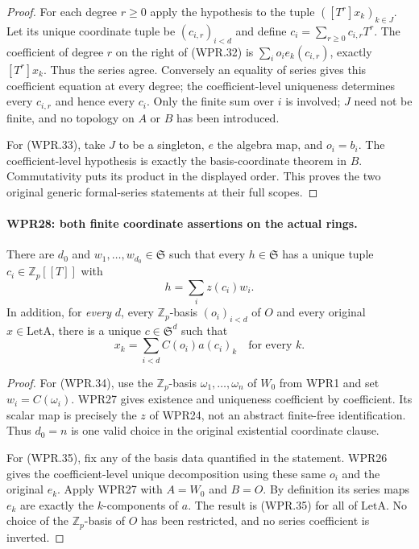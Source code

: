 \documentclass[11pt,a4paper]{article}
\numberwithin{equation}{section}
\theoremstyle{remark}\newtheorem{remark}[theorem]{Remark}
\begin{document}
\begin{proof}
For each degree $r\geq0$ apply the hypothesis to the tuple
$([T^r]x_k)_{k\in J}$. Let its unique coordinate tuple be
$(c_{i,r})_{i<d}$ and define $c_i=\sum_{r\geq0}c_{i,r}T^r$.
The coefficient of degree $r$ on the right of (WPR.32) is
$\sum_i o_i e_k(c_{i,r})$, exactly $[T^r]x_k$. Thus the
series agree. Conversely an equality of series gives this
coefficient equation at every degree; the coefficient-level
uniqueness determines every $c_{i,r}$ and hence every $c_i$.
Only the finite sum over $i$ is involved; $J$ need not be
finite, and no topology on $A$ or $B$ has been introduced.

For (WPR.33), take $J$ to be a singleton, $e$ the algebra map,
and $o_i=b_i$. The coefficient-level hypothesis is exactly
the basis-coordinate theorem in $B$. Commutativity puts its
product in the displayed order. This proves the two original
generic formal-series statements at their full scopes.
\end{proof}

\paragraph{WPR28: both finite coordinate assertions on the actual rings.}
\label{claim:WPR28}
There are $d_0$ and $w_1,\ldots,w_{d_0}\in\mathfrak S$ such
that every $h\in\mathfrak S$ has a unique tuple
$c_i\in\mathbb Z_p[[T]]$ with
\[
                         h=\sum_i z(c_i)w_i.                \tag{WPR.34}
\]
In addition, for \emph{every} $d$, every $\mathbb Z_p$-basis
$(o_i)_{i<d}$ of $O$ and every original $x\in\mathrm{LetA}$,
there is a unique $c\in\mathfrak S^d$ such that
\[
                         x_k=\sum_{i<d}C(o_i)a(c_i)_k
                         \quad\text{for every }k.           \tag{WPR.35}
\]

\begin{proof}
For (WPR.34), use the $\mathbb Z_p$-basis
$\omega_1,\ldots,\omega_n$ of $W_0$ from WPR1 and set
$w_i=C(\omega_i)$. WPR27 gives existence and uniqueness
coefficient by coefficient. Its scalar map is precisely the
$z$ of WPR24, not an abstract finite-free identification.
Thus $d_0=n$ is one valid choice in the original existential
coordinate clause.

For (WPR.35), fix any of the basis data quantified in the
statement. WPR26 gives the coefficient-level unique
decomposition using these same $o_i$ and the original $e_k$.
Apply WPR27 with $A=W_0$ and $B=O$. By definition its series
maps $e_k$ are exactly the $k$-components of $a$. The result
is (WPR.35) for all of $\mathrm{LetA}$. No choice of the
$\mathbb Z_p$-basis of $O$ has been restricted, and no series
coefficient is inverted.
\end{proof}
\end{document}
